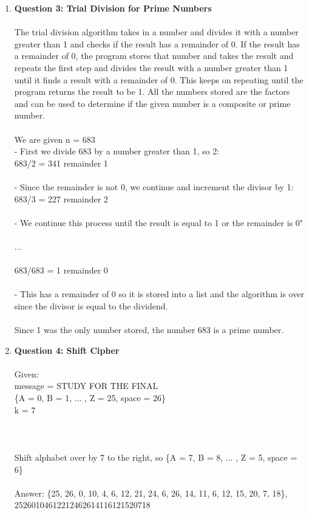 \documentclass[11pt]{article}
\begin{document}
\begin{enumerate}
\begin{enumerate}[label=(\alph*)]
\end{enumerate}

\item
\textbf{Question 3: Trial Division for Prime Numbers} \\ %
\\
The trial division algorithm takes in a number and divides it with a number greater than 1 and checks if the result has a remainder of 0. If the result has a remainder of 0, the program stores that number and takes the result and repeats the first step and divides the result with a number greater than 1 until it finds a result with a remainder of 0. This keeps on repeating until the program returns the result to be 1. All the numbers stored are the factors and can be used to determine if the given number is a composite or prime number.
\\ \\
We are given n = 683 \\
- First we divide 683 by a number greater than 1, so 2: \\
683/2 = 341 remainder 1 \\
\\
- Since the remainder is not 0, we continue and increment the divisor by 1: \\
683/3 = 227 remainder 2 \\
\\
- We continue this process until the result is equal to 1 or the remainder is 0" \\
\\
...\\
\\
683/683 = 1 remainder 0 \\
\\
- This has a remainder of 0 so it is stored into a list and the algorithm is over since the divisor is equal to the dividend. \\
\\
Since 1 was the only number stored, the number 683 is a prime number.\\


\item
\textbf{Question 4: Shift Cipher} \\ %
\\
Given: \\
message = STUDY FOR THE FINAL \\
\{A = 0, B = 1, ... , Z = 25, space = 26\} \\
k = 7 \\
\\ \\ \\
Shift alphabet over by 7 to the right, so \{A = 7, B = 8, ... , Z = 5, space = 6\} \\
\\
Answer: \{25, 26, 0, 10, 4, 6, 12, 21, 24, 6, 26, 14, 11, 6, 12, 15, 20, 7, 18\}, 25260104612212462614116121520718


\end{enumerate}
\end{document}
